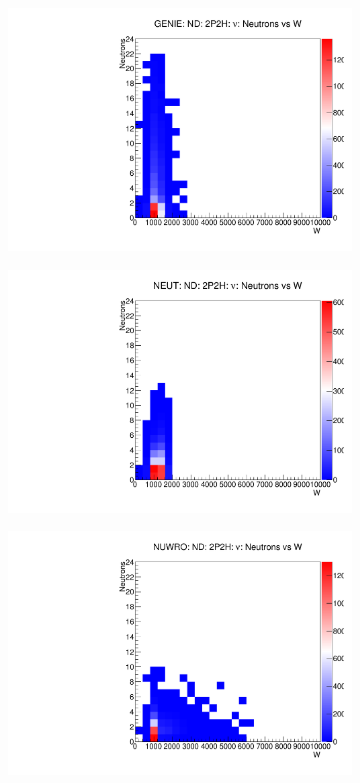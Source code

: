 \documentclass[12pt]{article}
\begin{document}
\begin{figure}
\centering
\begin{subfigure}[b]{0.32\textwidth}
  \includegraphics[width=\textwidth]{nneutrons_w/Nneutrons_W_nuc_rest_2p2h_GENIE_ND_numu.pdf}
\end{subfigure}
\begin{subfigure}[b]{0.32\textwidth}
  \includegraphics[width=\textwidth]{nneutrons_w/Nneutrons_W_nuc_rest_2p2h_NEUT_ND_numu.pdf}
\end{subfigure}
\begin{subfigure}[b]{0.32\textwidth}
  \includegraphics[width=\textwidth]{nneutrons_w/Nneutrons_W_nuc_rest_2p2h_NUWRO_ND_numu.pdf}

\end{subfigure}
\end{figure}
\end{document}
